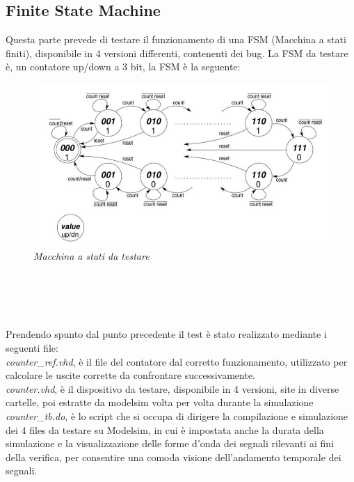 \\
\\
\\
\\
\\
\\
\\
\\
\\
\\
\subsection{Finite State Machine}
Questa parte prevede di testare il  funzionamento di una FSM (Macchina a stati finiti), disponibile in 4 versioni differenti, contenenti dei bug.  
La FSM da testare è, un contatore up/down a 3 bit, la FSM è la seguente:
\begin{figure}[!htb]
	\centering
	\includegraphics[scale=0.8]{immagini/fsm_lab6}
	\caption{\textit{Macchina a stati da testare}}
	\label{Fsm, up-down counter}
\end{figure}
\\
\\
\\
\\
Prendendo spunto dal punto precedente il test è stato realizzato mediante i seguenti file:\\
\textit{counter\_ref.vhd}, è il file del contatore dal corretto funzionamento, utilizzato per calcolare le uscite corrette da confrontare successivamente.
\\
\textit{counter.vhd}, è il dispositivo da testare, disponibile in 4 versioni, site in diverse cartelle, poi estratte da modelsim volta per volta durante la simulazione
\\
\textit{counter\_tb.do}, è lo script che si occupa di dirigere la compilazione e simulazione dei 4 files da testare su Modelsim, in cui è impostata anche la durata della simulazione e la visualizzazione delle forme d’onda dei segnali rilevanti ai fini della verifica, per consentire una comoda visione dell’andamento temporale dei segnali.

